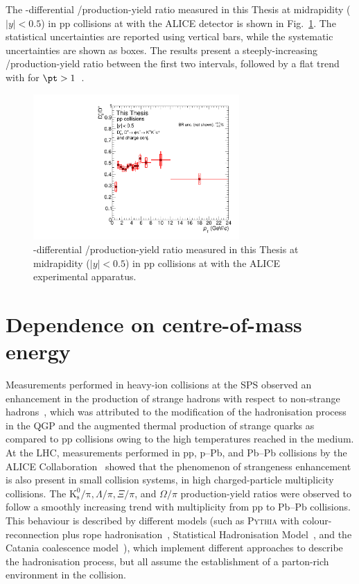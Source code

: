 The \pt-differential \ds/\dpl production-yield ratio measured in this Thesis at midrapidity \mbox{($\lvert y\rvert<0.5$)} in pp collisions at \thirteen with the ALICE detector is shown in Fig.~\ref{fig:dsdplratio}. The statistical uncertainties are reported using vertical bars, while the systematic uncertainties are shown as boxes. The results present a steeply-increasing \ds/\dpl production-yield ratio between the first two \pt intervals, followed by a flat trend with \pt for $\pt>1$~\gevc. 


\begin{figure}[tb]
    \centering
    \includegraphics[width=0.7\textwidth]{Figures/Chapter 7/DsOverDplus.pdf}
    \caption{\pt-differential \ds/\dpl production-yield ratio measured in this Thesis at midrapidity ($\lvert y\rvert<0.5$) in pp collisions at \thirteen with the ALICE experimental apparatus.}
    \label{fig:dsdplratio}
\end{figure}

\section{Dependence on centre-of-mass energy}
Measurements performed in heavy-ion collisions at the SPS observed an enhancement in the production of strange hadrons with respect to non-strange hadrons~\cite{WA97:1999uwz,NA57:2010tnk}, which was attributed to the modification of the hadronisation process in the QGP and the augmented thermal production of strange quarks as compared to pp collisions owing to the high temperatures reached in the medium. At the LHC, measurements performed in pp, p--Pb, and Pb--Pb collisions by the ALICE Collaboration~\cite{ALICE:2016fzo,ALICE:2013xmt,ALICE:2015mpp} showed that the phenomenon of strangeness enhancement is also present in small collision systems, in high charged-particle multiplicity collisions. The $\mathrm{K^0_s/\pi}, \Lambda/\pi, \Xi/\pi$, and $\Omega/\pi$ production-yield ratios were observed to follow a smoothly increasing trend with multiplicity from pp to Pb--Pb collisions. This behaviour is described by different models (such as \textsc{Pythia} with colour-reconnection plus rope hadronisation~\cite{Bierlich:2014xba}, Statistical Hadronisation Model~\cite{Andronic:2017pug}, and the Catania coalescence model~\cite{Minissale:2020bif}), which implement different approaches to describe the hadronisation process, but all assume the establishment of a parton-rich environment in the collision.

